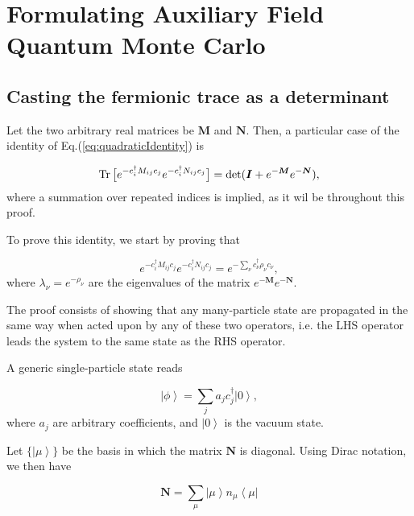 \chapter{Formulating Auxiliary Field Quantum Monte Carlo}
\label{ap:theoAFQMC}

\pagebreak

\section{Casting the fermionic trace as a determinant}\label{sec:trace_det}

Let the two arbitrary real matrices be $\bm M$ and $\bm N$.
Then, a particular case of the identity of Eq.(\ref{eq:quadraticIdentity}) is

\begin{equation}\label{eq:particularIdentity}
\operatorname{Tr} \big[ e^{-c_i^\dagger M_{ij} c_j} e^{-c_i^\dagger N_{ij} c_j} \big] = \text{det} ( \bm I + e^{-{\bm M}} e^{-{\bm N}} ) ,
\end{equation}
where a summation over repeated indices is implied, as it wil be throughout this proof.

To prove this identity, we start by proving that

\begin{equation}\label{eq:identity_prod_exps}
e^{-c_i^\dagger M_{ij} c_j}  e^{-c_i^\dagger N_{ij} c_j} = e^{-\sum_\nu c_\nu^\dagger \rho_\nu c_\nu} ,
\end{equation}
where $\lambda_\nu = e^{-\rho_\nu}$ are the eigenvalues of the matrix $e^{-{\bm M}} e^{-{\bm N}}$.

The proof consists of showing that any many-particle state are propagated in the same way when acted upon by any of these two operators, i.e. the LHS operator leads the system to the same state as the RHS operator.

A generic single-particle state reads

\begin{equation}
\left| \phi \right\rangle = \sum_j a_j c_j^\dagger \left| 0 \right\rangle ,
\end{equation}
where $a_j$ are arbitrary coefficients, and $\left| 0 \right\rangle$ is the vacuum state.

Let $\{\left| \mu \right\rangle \}$ be the basis in which the matrix $\bm N$ is diagonal. Using Dirac notation, we then have

\begin{equation}
\bm N = \sum_{\mu} \left| \mu \right\rangle n_\mu \left\langle \mu \right|
\end{equation}

